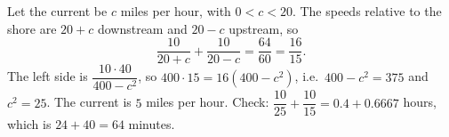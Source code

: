 Let the current be $c$ miles per hour, with $0<c<20$. The speeds relative to the shore are $20+c$ downstream and $20-c$ upstream, so
\[
\dfrac{10}{20+c}+\dfrac{10}{20-c}=\dfrac{64}{60}=\dfrac{16}{15}.
\]
The left side is $\dfrac{10\cdot40}{400-c^2}$, so $400\cdot15=16(400-c^2)$, i.e.\ $400-c^2=375$ and $c^2=25$. The current is $\boxed{5}$ miles per hour. Check: $\dfrac{10}{25}+\dfrac{10}{15}=0.4+0.6667$ hours, which is $24+40=64$ minutes.
